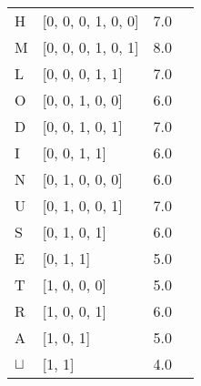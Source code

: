 \documentclass[12pt]{article}
\begin{document}
\begin{tabular}{l l l l}
H	&	[0, 0, 0, 1, 0, 0]	&	7.0\\
M	&	[0, 0, 0, 1, 0, 1]	&	8.0\\
L	&	[0, 0, 0, 1, 1]	&	7.0\\
O	&	[0, 0, 1, 0, 0]	&	6.0\\
D	&	[0, 0, 1, 0, 1]	&	7.0\\
I	&	[0, 0, 1, 1]	&	6.0\\
N	&	[0, 1, 0, 0, 0]	&	6.0\\
U	&	[0, 1, 0, 0, 1]	&	7.0\\
S	&	[0, 1, 0, 1]	&	6.0\\
E	&	[0, 1, 1]	&	5.0\\
T	&	[1, 0, 0, 0]	&	5.0\\
R	&	[1, 0, 0, 1]	&	6.0\\
A	&	[1, 0, 1]	&	5.0\\
$\sqcup$	&	[1, 1]	&	4.0\\
\end{tabular}
\end{document}
